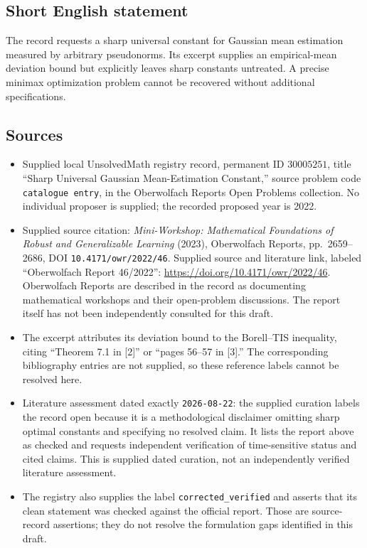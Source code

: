 \documentclass[11pt]{article}
\begin{document}
\subsection{Short English statement}
The record requests a sharp universal constant for Gaussian mean estimation measured by arbitrary pseudonorms. Its excerpt supplies an empirical-mean deviation bound but explicitly leaves sharp constants untreated. A precise minimax optimization problem cannot be recovered without additional specifications.
\subsection{Sources}
\begin{itemize}
\item Supplied local UnsolvedMath registry record, permanent ID \(30005251\), title ``Sharp Universal Gaussian Mean-Estimation Constant,'' source problem code \texttt{catalogue entry}, in the Oberwolfach Reports Open Problems collection. No individual proposer is supplied; the recorded proposed year is 2022.
\item Supplied source citation: \emph{Mini-Workshop: Mathematical Foundations of Robust and Generalizable Learning} (2023), Oberwolfach Reports, pp.~2659--2686, DOI \texttt{10.4171/owr/2022/46}. Supplied source and literature link, labeled ``Oberwolfach Report 46/2022'': \url{https://doi.org/10.4171/owr/2022/46}. Oberwolfach Reports are described in the record as documenting mathematical workshops and their open-problem discussions. The report itself has not been independently consulted for this draft.
\item The excerpt attributes its deviation bound to the Borell--TIS inequality, citing ``Theorem 7.1 in [2]'' or ``pages 56--57 in [3].'' The corresponding bibliography entries are not supplied, so these reference labels cannot be resolved here.
\item Literature assessment dated exactly \texttt{2026-08-22}: the supplied curation labels the record open because it is a methodological disclaimer omitting sharp optimal constants and specifying no resolved claim. It lists the report above as checked and requests independent verification of time-sensitive status and cited claims. This is supplied dated curation, not an independently verified literature assessment.
\item The registry also supplies the label \texttt{corrected\_verified} and asserts that its clean statement was checked against the official report. Those are source-record assertions; they do not resolve the formulation gaps identified in this draft.
\end{itemize}
\end{document}
